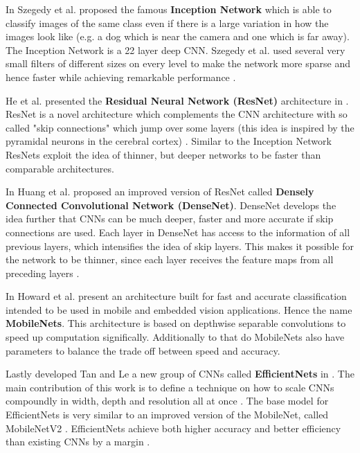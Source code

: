 \documentclass[10pt,twocolumn,letterpaper]{article}
\begin{document}
In \cite{szegedy2015going} Szegedy et al. proposed the famous \textbf{Inception Network}  which is able to classify images of the same class even if there is a large variation in how the images look like (e.g. a dog which is near the camera and one which is far away). The Inception Network is a 22 layer deep CNN. Szegedy et al. used several very small filters of different sizes on every level to make the network more sparse and hence faster while achieving remarkable performance \cite{szegedy2015going}.

He et al. presented the \textbf{Residual Neural Network (ResNet)} architecture in \cite{he2016deep}. ResNet is a novel architecture which complements the CNN architecture with so called "skip connections" which jump over some layers (this idea is inspired by the pyramidal neurons \cite{wiki:pyramid} in the cerebral cortex) \cite{he2016deep}. Similar to the Inception Network ResNets exploit the idea of thinner, but deeper networks to be faster than comparable architectures.  

In \cite{huang2017densely} Huang et al. proposed an improved version of ResNet called \textbf{Densely Connected Convolutional Network (DenseNet)}. DenseNet develops the idea further that CNNs can be much deeper, faster and more accurate if skip connections are used. Each layer in DenseNet has access to the information of all previous layers, which intensifies the idea of skip layers. This makes it possible for the network to be thinner, since each layer receives the feature maps from all preceding layers \cite{zhu2017densenet}.

In \cite{howard2017mobilenets} Howard et al. present an architecture built for fast and accurate classification intended to be used in mobile and embedded vision applications. Hence the name \textbf{MobileNets}. This architecture is based on depthwise separable convolutions \cite{chollet2017xception} to speed up computation significally. Additionally to that do MobileNets also have parameters to balance the trade off between speed and accuracy.

Lastly developed Tan and Le a new group of CNNs called \textbf{EfficientNets} in \cite{tan2019efficientnet}. The main contribution of this work is to define a technique on how to scale CNNs compoundly in width, depth and resolution all at once \cite{tan2019efficientnet}. The base model for EfficientNets is very similar to an improved version of the MobileNet, called MobileNetV2 \cite{sandler2018mobilenetv2}. EfficientNets achieve both higher accuracy and better efficiency than existing CNNs by a margin \cite{tan2019efficientnet}. 
\end{document}

